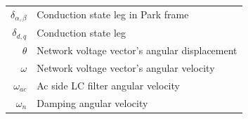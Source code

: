 \begin{scriptsize}
\begin{tabularx}{\textwidth}{r|X}
  $\delta_{\alpha,\beta}$           & Conduction state leg in Park frame\\
  $\delta_{d,q}$                    & Conduction state leg\\
  $\theta$                          & Network voltage vector’s angular displacement\\
  $\omega$                          & Network voltage vector’s angular velocity\\
  $\omega_{ac}$                     & Ac side LC filter angular velocity\\
  $\omega_{n}$                      & Damping angular velocity\\
  \end{tabularx}
  \end{scriptsize}
		
